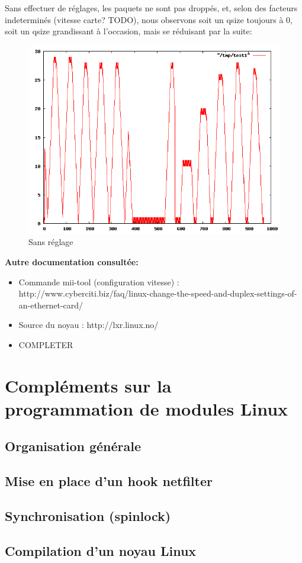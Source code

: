 \documentclass[a4paper]{article}
\begin{document}
Sans effectuer de  réglages, les paquets ne sont pas droppés, et, selon
des facteurs indeterminés (vitesse carte? TODO), nous observons soit un
qsize toujours à 0, soit un qsize grandissant à l'occasion, mais se
réduisant par la suite:
\begin{figure}[!ht]
	\centering
	\includegraphics[scale=.5]{qsize_default.png}
	\caption{\label{qsize_default} Sans réglage}
\end{figure}


\newpage



\textbf{Autre documentation consultée:}
\begin{itemize}
	\item Commande mii-tool (configuration vitesse) : 
	http://www.cyberciti.biz/faq/linux-change-the-speed-and-duplex-settings-of-an-ethernet-card/
	\item Source du noyau : http://lxr.linux.no/
	\item COMPLETER
\end{itemize}


\newpage
\appendix

\section{Compléments sur la programmation de modules Linux}
\subsection{Organisation générale}
\subsection{Mise en place d'un hook netfilter}
\subsection{Synchronisation (spinlock)}
\subsection{Compilation d'un noyau Linux}
\end{document}
